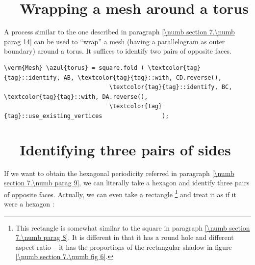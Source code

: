 \section{~~Wrapping a mesh around a torus}\label{\numb section 7.\numb parag 15}

A process similar to the one described in paragraph \ref{\numb section 7.\numb parag 14}
can be used to ``wrap'' a mesh (having a parallelogram as outer boundary) around
a torus.
It suffices to identify two pairs of opposite faces.

\begin{Verbatim}[commandchars=\\\{\},formatcom=\small\tt,frame=single,
   label=parag-\ref{\numb section 7.\numb parag 15}.cpp,rulecolor=\color{coment},
   baselinestretch=0.94,framesep=2mm                                             ]
   \verm{Mesh} \azul{torus} = square.fold ( \textcolor{tag}{tag}::identify, AB, \textcolor{tag}{tag}::with, CD.reverse(),
                              \textcolor{tag}{tag}::identify, BC, \textcolor{tag}{tag}::with, DA.reverse(),
                              \textcolor{tag}{tag}::use_existing_vertices                 );
\end{Verbatim}


\section{~~Identifying three pairs of sides}\label{\numb section 7.\numb parag 16}

If we want to obtain the hexagonal periodicity referred in paragraph
\ref{\numb section 7.\numb parag 9}, we can literally take a hexagon and
identify three pairs of opposite faces.
Actually, we can even take a rectangle%
\footnote{This rectangle is somewhat similar to the square in paragraph
\ref{\numb section 7.\numb parag 8}.
It is different in that it has a round hole and different aspect ratio --
it has the proportions of the rectangular shadow in figure \ref{\numb section 7.\numb fig 6}.}
and treat it as if it were a hexagon :

